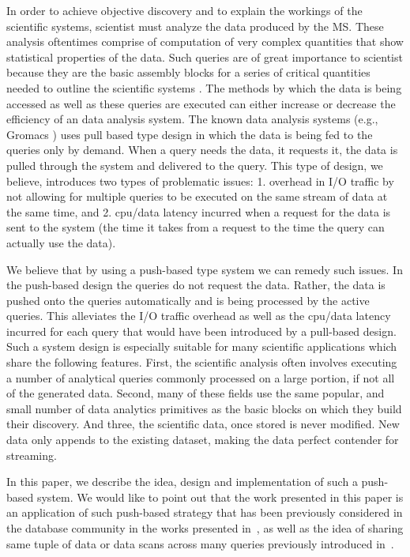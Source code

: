 \documentclass[10pt,journal,final,letterpaper,twocolumn]{IEEEtran}
\begin{document}
In order to achieve objective discovery and to explain the workings
of the scientific systems, scientist must analyze the data produced
by the MS. These analysis oftentimes comprise of computation of very
complex quantities that show statistical properties of the data.
Such queries are of great importance to scientist because they are
the basic assembly blocks for a series of critical quantities needed
to outline the scientific systems \cite{Frenkel:api01}. The methods
by which the data is being accessed as well as these queries are
executed can either increase or decrease the efficiency of an data
analysis system. The known data analysis systems (e.g., Gromacs
\cite{Gromacs-online}) uses pull based type design in which the data
is being fed to the queries only by demand. When a query needs the
data, it requests it, the data is pulled through the system and
delivered to the query. This type of design, we believe, introduces
two types of problematic issues: 1. overhead in I/O traffic by not
allowing for multiple queries to be executed on the same stream of
data at the same time, and 2. cpu/data latency incurred when a
request for the data is sent to the system (the time it takes from a
request to the time the query can actually use the data).

We believe that by using a push-based type system we can remedy such
issues. In the push-based design the queries do not request the
data. Rather, the data is pushed onto the queries automatically and
is being processed by the active queries. This alleviates the I/O
traffic overhead as well as the cpu/data latency incurred for each
query that would have been introduced by a pull-based design. Such a
system design is especially suitable for many scientific
applications which share the following features. First, the
scientific analysis often involves executing a number of analytical
queries commonly processed on a large portion, if not all of the
generated data. Second, many of these fields use the same popular,
and small number of data analytics primitives as the basic blocks on
which they build their discovery. And three, the scientific data,
once stored is never modified. New data only appends to the existing
dataset, making the data perfect contender for streaming.



In this paper, we describe the idea, design and implementation of
such a push-based system. We would like to point out that the work
presented in this paper is an application of such push-based
strategy that has been previously considered in the database
community in the works presented in~\cite{DataPath,Volcano,Qpipe},
as well as the idea of sharing same tuple of data or data scans
across many queries previously introduced
in~\cite{Candea,PredictablePerformance,CooperativeScans}.
\end{document}
